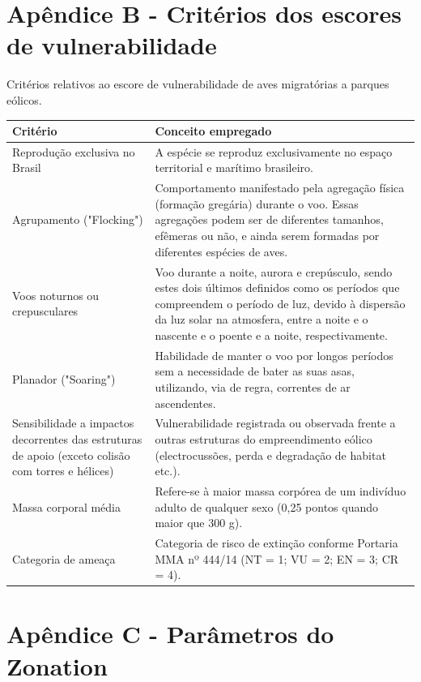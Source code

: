 \documentclass[
  oneside]{scrbook}
\begin{document}
\newpage

\hypertarget{apuxeandice-b---crituxe9rios-dos-escores-de-vulnerabilidade}{%
\chapter{Apêndice B - Critérios dos escores de vulnerabilidade}\label{apuxeandice-b---crituxe9rios-dos-escores-de-vulnerabilidade}}

Critérios relativos ao escore de vulnerabilidade de aves migratórias a parques eólicos.

\begin{longtable}[t]{>{\raggedright\arraybackslash}p{5cm}>{\raggedright\arraybackslash}p{10cm}}
\toprule
Critério & Conceito empregado\\
\midrule
Reprodução exclusiva no Brasil & A espécie se reproduz exclusivamente no espaço territorial e marítimo brasileiro.\\
Agrupamento ("Flocking") & Comportamento manifestado pela agregação física (formação gregária) durante o voo. Essas agregações podem ser de diferentes tamanhos, efêmeras ou não, e ainda serem formadas por diferentes espécies de aves.\\
Voos noturnos ou crepusculares & Voo durante a noite, aurora e crepúsculo, sendo estes dois últimos definidos como os períodos que compreendem o período de luz, devido à dispersão da luz solar na atmosfera, entre a noite e o nascente e o poente e a noite, respectivamente.\\
Planador ("Soaring") & Habilidade de manter o voo por longos períodos sem a necessidade de bater as suas asas, utilizando, via de regra, correntes de ar ascendentes.\\
Sensibilidade a impactos decorrentes das estruturas de apoio (exceto colisão com torres e hélices) & Vulnerabilidade registrada ou observada frente a outras estruturas do empreendimento eólico (electrocussões, perda e degradação de habitat etc.).\\
\addlinespace
Massa corporal média & Refere-se à maior massa corpórea de um indivíduo adulto de qualquer sexo (0,25 pontos quando maior que 300 g).\\
Categoria de ameaça & Categoria de risco de extinção conforme Portaria MMA nº 444/14 (NT = 1; VU = 2; EN = 3; CR = 4).\\
\bottomrule
\end{longtable}

\newpage

\hypertarget{apuxeandice-c---paruxe2metros-do-zonation}{%
\chapter{Apêndice C - Parâmetros do Zonation}\label{apuxeandice-c---paruxe2metros-do-zonation}}
\end{document}
